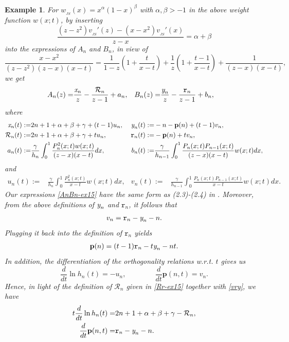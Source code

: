 \documentclass[12pt,a4paper]{article}    %
\newtheorem{exm}{Example}
\numberwithin{equation}{section}
\begin{document}
\begin{exm}\label{JS-FH}
For $w_{_{JS}}(x)=x^{\alpha}(1-x)^{\beta}$ with $\alpha,\beta>-1$ in the above weight function $w(x;t)$, by inserting
\[\frac{(z-z^2)v_{_{JS}}'(z)-(x-x^2)v_{_{JS}}'(x)}{z-x}=\alpha+\beta\]
into the expressions of $A_n$ and $B_n$, in view of
\[\frac{x-x^2}{\left(z-z^2\right)(z-x) (x-t) }=\frac{1}{1-z}\left(1+\frac{t}{x-t}\right)+\frac{1}{z}\left(1+\frac{t-1}{x-t}\right)+\frac{1}{(z-x)(x-t)},\]
we get
\begin{align}\label{AnBn-ex15}
A_n(z)=&\frac{\emph{x}_n}{z}-\frac{\mathcal{R}_n}{z-1}+a_n,&
B_n(z)=&\frac{\emph{y}_n}{z}-\frac{\texttt{r}_n}{z-1}+b_n,
\end{align}
where
\begin{align}
\emph{x}_n(t):=&2n+1+\alpha+\beta+\gamma+(t-1)u_n,&\;\emph{y}_n(t):=&-n-\mathbf{p}(n)+(t-1)v_n,\label{xy-ex15}\\
\mathcal{R}_n(t):=&2n+1+\alpha+\beta+\gamma+tu_n,&\;\texttt{r}_n(t):=&-\mathbf{p}(n)+tv_n,\label{Rr-ex15}\\
a_n(t):=&\frac{\gamma}{h_n}\int_0^{1}\frac{P_n^2(x;t)w(x;t)}{(z-x)(x-t)}dx,&\; b_n(t):=&\frac{\gamma}{h_{n-1}}\int_0^{1}\frac{P_n(x;t)P_{n-1}(x;t)}{(z-x)(x-t)}w(x;t)dx,\nonumber
\end{align}
and
\begin{align*}
u_n(t):=&\frac{\gamma}{h_n}\int_{0}^1\frac{P_n^2(x;t)}{x-t}w(x;t)dx,& v_n(t):=&\frac{\gamma}{h_{n-1}}\int_{0}^1\frac{P_n(x;t)P_{n-1}(x;t)}{x-t}w(x;t)dx.
\end{align*}
Our expressions \eqref{AnBn-ex15} have the same form as  (2.3)-(2.4) in \cite{MinChenMMAS}. Moreover, from the above definitions of $\emph{y}_n$ and $\texttt{r}_n$, it follows that
\begin{align}\label{vry}
v_n=\texttt{r}_n-\emph{y}_n-n.
\end{align}
Plugging it back into the definition of $\texttt{r}_n$ yields
\begin{align}\label{p-ex15}
\mathbf{p}(n)=(t-1)\texttt{r}_n-t\emph{y}_n-nt.
\end{align}
In addition, the differentiation of the orthogonality relations w.r.t. $t$ gives us
\[\frac{d}{dt}\ln h_n(t)=-u_n,\qquad\qquad\frac{d}{dt}\mathbf{p}(n,t)=v_n.\]
Hence, in light of the definition of $\mathcal{R}_n$ given in \eqref{Rr-ex15} together with \eqref{vry}, we have
\begin{align}
t\frac{d}{dt}\ln h_n(t)=&2n+1+\alpha+\beta+\gamma-\mathcal{R}_n,\label{Dh-ex15}\\
\frac{d}{dt}\mathbf{p}(n,t)=&\texttt{r}_n-\emph{y}_n-n.\label{Dp-ex15}

\end{align}
\end{exm}
\end{document}

